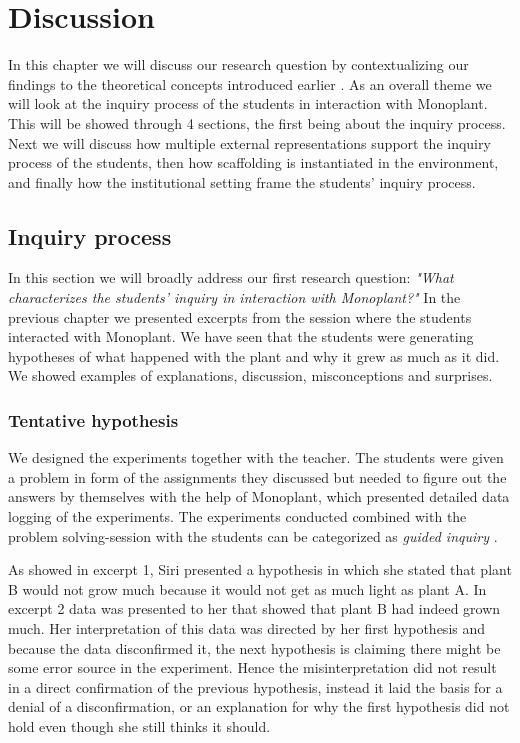 \chapter{Discussion}
In this chapter we will discuss our research question by contextualizing our findings to the theoretical concepts introduced earlier . As an overall theme we will look at the inquiry process of the students in interaction with Monoplant. This will be showed through 4 sections, the first being about the inquiry process. Next we will discuss how multiple external representations support the inquiry process of the students, then how scaffolding is instantiated in the environment, and finally how the institutional setting frame the students' inquiry process.


\section{Inquiry process}
In this section we will broadly address our first research question: \emph{"What characterizes the students’ inquiry in interaction with Monoplant?"}
In the previous chapter we presented excerpts from the session where the students interacted with Monoplant. We have seen that the students were generating hypotheses of what happened with the plant and why it grew as much as it did. We showed examples of explanations, discussion, misconceptions and surprises.

\subsection{Tentative hypothesis}
We designed the experiments together with the teacher. The students were given a problem in form of the assignments they discussed but needed to figure out the answers by themselves with the help of Monoplant, which presented detailed data logging of the experiments. The experiments conducted combined with the problem solving-session with the students can be categorized as \emph{guided inquiry}  \citetext{\citet{staver1987analysis}, referenced in \citealp{prince2006inductive}}. 

As showed in excerpt 1, Siri presented a hypothesis in which she stated that plant B would not grow much because it would not get as much light as plant A. In excerpt 2 data was presented to her that showed that plant B had indeed grown much. Her interpretation of this data was directed by her first hypothesis and because the data disconfirmed it, the next hypothesis is claiming there might be some error source in the experiment. Hence the misinterpretation did not result in a direct confirmation of the previous hypothesis, instead it laid the basis for a denial of a disconfirmation, or an explanation for why the first hypothesis did not hold even though she still thinks it should.

